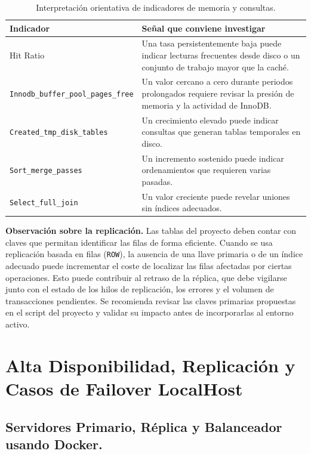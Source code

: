 \documentclass[10pt,a4paper]{article}
\begin{document}
\begin{table}[htbp]
    \centering
    \small
    \begin{tabular}{|p{4.6cm}|p{9.2cm}|}
        \hline
        \textbf{Indicador} & \textbf{Señal que conviene investigar} \\ \hline
        Hit Ratio & Una tasa persistentemente baja puede indicar lecturas frecuentes desde disco o un conjunto de trabajo mayor que la caché. \\ \hline
        \texttt{Innodb\_buffer\_pool\_pages\_free} & Un valor cercano a cero durante periodos prolongados requiere revisar la presión de memoria y la actividad de InnoDB. \\ \hline
        \texttt{Created\_tmp\_disk\_tables} & Un crecimiento elevado puede indicar consultas que generan tablas temporales en disco. \\ \hline
        \texttt{Sort\_merge\_passes} & Un incremento sostenido puede indicar ordenamientos que requieren varias pasadas. \\ \hline
        \texttt{Select\_full\_join} & Un valor creciente puede revelar uniones sin índices adecuados. \\ \hline
    \end{tabular}
    \caption{Interpretación orientativa de indicadores de memoria y consultas.}
    \label{tab:indicadores-memoria}
\end{table}

\textbf{Observación sobre la replicación.}
Las tablas del proyecto deben contar con claves que 
permitan identificar las filas de forma eficiente. 
Cuando se usa replicación basada en filas (\texttt{ROW}), 
la ausencia de una llave primaria o de un índice adecuado 
puede incrementar el coste de localizar las filas afectadas
por ciertas operaciones. 
Esto puede contribuir al retraso de la réplica, 
que debe vigilarse junto con el estado de los hilos de 
replicación, los errores y el volumen de transacciones 
pendientes. Se recomienda revisar las claves primarias 
propuestas en el script del proyecto y validar su impacto 
antes de incorporarlas al entorno activo.

\newpage



\section{Alta Disponibilidad, Replicación y Casos de Failover LocalHost}
\subsection{Servidores Primario, Réplica y Balanceador usando Docker.}
\end{document}
